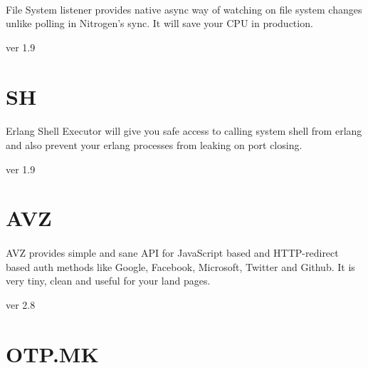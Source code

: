 \documentclass[11pt]{article}
\begin{document}
\paragraph{}
File System listener provides native async way of watching on
file system changes unlike polling in Nitrogen's sync. It will save
your CPU in production.

 ver 1.9

\section*{SH}
\paragraph{}
Erlang Shell Executor will give you safe access to calling system shell
from erlang and also prevent your erlang processes from leaking on port closing.

 ver 1.9

\section*{AVZ}
\paragraph{}
AVZ provides simple and sane API for JavaScript based and HTTP-redirect
based auth methods like Google, Facebook, Microsoft, Twitter and Github.
It is very tiny, clean and useful for your land pages.

 ver 2.8


\section*{OTP.MK}
\paragraph{}
\end{document}
